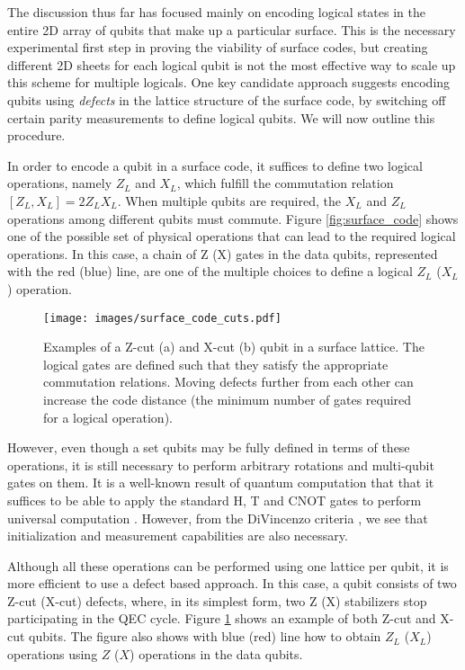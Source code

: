 The discussion thus far has focused mainly on encoding logical states in the
entire 2D array of qubits that make up a particular surface. This is the
necessary experimental first step in proving the viability of surface codes, but
creating different 2D sheets for each logical qubit is not the most effective
way to scale up this scheme for multiple logicals. One key candidate approach
suggests encoding qubits using \textit{defects} in the lattice structure of the
surface code, by switching off certain parity measurements to define logical
qubits. We will now outline this procedure.

In order to encode a qubit in a surface code, it suffices to define two logical
operations, namely $Z_L$ and $X_L$, which fulfill the commutation relation
$[Z_L,X_L] = 2Z_LX_L$. When multiple qubits are required, the $X_L$ and $Z_L$
operations among different qubits must commute. Figure \ref{fig:surface_code}
shows one of the possible set of physical operations that can lead to the
required logical operations. In this case, a chain of Z (X) gates in the data
qubits, represented with the red (blue) line, are one of the multiple choices to
define a logical $Z_L$ ($X_L$) operation.

\begin{figure}[htbp]
  \centering
  \texttt{[image: images/surface\_code\_cuts.pdf]}
  \caption{Examples of a Z-cut (a) and X-cut (b) qubit in a surface lattice. The
    logical gates are defined such that they satisfy the appropriate commutation
    relations. Moving defects further from each other can increase the code
    distance (the minimum number of gates required for a logical operation).}
  \label{fig:cuts}
\end{figure}

However, even though a set qubits may be fully defined in terms of these
operations, it is still necessary to perform arbitrary rotations and multi-qubit
gates on them. It is a well-known result of quantum computation that that it
suffices to be able to apply the standard H, T and CNOT gates to perform
universal computation \cite{nielsen_chuang_2010}. However, from the DiVincenzo
criteria \cite{DiCincenzoCriteria}, we see that initialization and
measurement capabilities are also necessary.

Although all these operations can be performed using one lattice per qubit,
it is more efficient to use a defect based approach. In this case, a qubit
consists of two Z-cut (X-cut) defects, where, in its simplest form, two Z (X)
stabilizers stop participating in the QEC cycle. Figure \ref{fig:cuts} shows an
example of both Z-cut and X-cut qubits. The figure also shows with blue
(red) line how to obtain $Z_L$ ($X_L$) operations using $Z$ ($X$) operations in
the data qubits.


